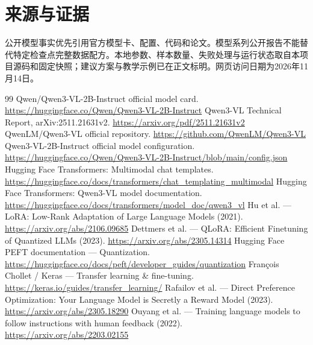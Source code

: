 \chapter*{来源与证据}
公开模型事实优先引用官方模型卡、配置、代码和论文。模型系列公开报告不能替代特定检查点完整数据配方。本地参数、样本数量、失败处理与运行状态取自本项目源码和固定快照；建议方案与教学示例已在正文标明。网页访问日期为2026年11月14日。
\begingroup\renewcommand{\bibname}{公开一手资料}
\begin{thebibliography}{99}
 Qwen/Qwen3-VL-2B-Instruct official model card.
\url{https://huggingface.co/Qwen/Qwen3-VL-2B-Instruct}
 Qwen3-VL Technical Report, arXiv:2511.21631v2.
\url{https://arxiv.org/pdf/2511.21631v2}
 QwenLM/Qwen3-VL official repository.
\url{https://github.com/QwenLM/Qwen3-VL}
 Qwen3-VL-2B-Instruct official model configuration.
\url{https://huggingface.co/Qwen/Qwen3-VL-2B-Instruct/blob/main/config.json}
 Hugging Face Transformers: Multimodal chat templates.
\url{https://huggingface.co/docs/transformers/chat_templating_multimodal}
 Hugging Face Transformers: Qwen3-VL model documentation.
\url{https://huggingface.co/docs/transformers/model_doc/qwen3_vl}
 Hu et al. — LoRA: Low-Rank Adaptation of Large Language Models (2021).
\url{https://arxiv.org/abs/2106.09685}
 Dettmers et al. — QLoRA: Efficient Finetuning of Quantized LLMs (2023).
\url{https://arxiv.org/abs/2305.14314}
 Hugging Face PEFT documentation — Quantization.
\url{https://huggingface.co/docs/peft/developer_guides/quantization}
 François Chollet / Keras — Transfer learning \& fine-tuning.
\url{https://keras.io/guides/transfer_learning/}
 Rafailov et al. — Direct Preference Optimization: Your Language Model is Secretly a Reward Model (2023).
\url{https://arxiv.org/abs/2305.18290}
 Ouyang et al. — Training language models to follow instructions with human feedback (2022).
\url{https://arxiv.org/abs/2203.02155}
\end{thebibliography}\endgroup
